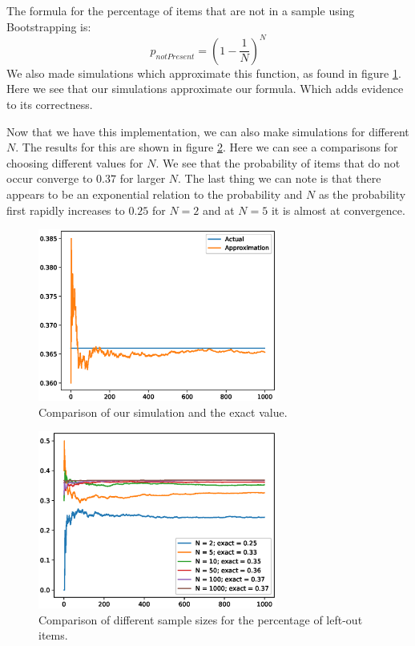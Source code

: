 \documentclass[11pt]{article}
\begin{document}
\section{}
The formula for the percentage of items that are not in a sample using Bootstrapping is:
\[
	p_{notPresent} = (1 - \frac{1}{N})^N
\]
We also made simulations which approximate this function, as found in figure \ref{fig:approx_vs_real}. Here we see that our simulations approximate our formula. Which adds evidence to its correctness.

Now that we have this implementation, we can also make simulations for different $N$. The results for this are shown in figure \ref{fig:leftout}. Here we can see a comparisons for choosing different values for $N$. We see that the probability of items that do not occur converge to $0.37$ for larger $N$. The last thing we can note is that there appears to be an exponential relation to the probability and $N$ as the probability first rapidly increases to $0.25$ for $N = 2$ and at $N=5$ it is almost at convergence.

\begin{figure}[H]
	\centering
	\includegraphics[width=0.7\textwidth]{images/approx_vs_real.eps}
	\caption{Comparison of our simulation and the exact value.}
	\label{fig:approx_vs_real}
\end{figure}

\begin{figure}[H]
	\centering
	\includegraphics[width=0.7\textwidth]{images/different_sample_sizes.eps}
	\caption{Comparison of different sample sizes for the percentage of left-out items.}
	\label{fig:leftout}
\end{figure}
\end{document}
